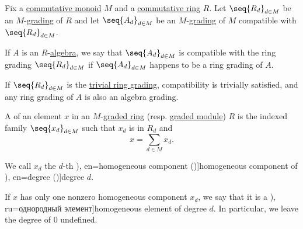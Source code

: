\begin{definition}\label{def:graded_algebra}
  Fix a \hyperref[def:monoid/commutative]{commutative monoid} \( M \) and a \hyperref[def:ring/commutative]{commutative ring} \( R \). Let \( \seq{ R_d }_{d \in M} \) be an \( M \)-\hyperref[def:graded_ring]{grading} of \( R \) and let \( \seq{ A_d }_{d \in M} \) be an \( M \)-\hyperref[def:graded_module]{grading} of \( M \) compatible with \( \seq{ R_d }_{d \in M} \).

  If \( A \) is an \( R \)-\hyperref[def:algebra_over_ring]{algebra}, we say that \( \seq{ A_d }_{d \in M} \) is compatible with the ring grading \( \seq{ R_d }_{d \in M} \) if \( \seq{ A_d }_{d \in M} \) happens to be a ring grading of \( A \).
\end{definition}
\begin{comments}
  \item If \( \seq{ R_d }_{d \in M} \) is the \hyperref[def:trivial_ring_grading]{trivial ring grading}, compatibility is trivially satisfied, and any ring grading of \( A \) is also an algebra grading.
\end{comments}

\begin{definition}\label{def:homogeneous_element}
  A  of an element \( x \) in an \( M \)-\hyperref[def:graded_ring]{graded ring} (resp. \hyperref[def:graded_module]{graded module}) \( R \) is the indexed family \( \seq{ x_d }_{d \in M} \) such that \( x_d \) is in \( R_d \) and
  \begin{equation}
    x = \sum_{d \in M} x_d.
  \end{equation}

  We call \( x_d \) the \( d \)-th \term[bg=еднородна компонента (\cite[57]{КоцевСидеров2016КомАлгебра}), en=homogeneous component (\cite[363]{Bourbaki1998Algebra1to3})]{homogeneous component} of \term[bg=степен (\cite[57]{КоцевСидеров2016КомАлгебра}), en=degree (\cite[363]{Bourbaki1998Algebra1to3})]{degree} \( d \).

  If \( x \) has only one nonzero homogeneous component \( x_d \), we say that it is a \term[bg=еднороден елемент (\cite[57]{КоцевСидеров2016КомАлгебра}), ru=однородный элемент]{homogeneous element} of degree \( d \). In particular, we leave the degree of \( 0 \) undefined.
\end{definition}

